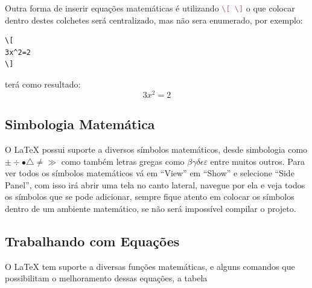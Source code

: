 Outra forma de inserir equações matemáticas é utilizando \lstinline[language=TeX]|\[ \]| o que colocar dentro destes colchetes será centralizado, mas não sera enumerado, por exemplo:
\begin{lstlisting}
\[
3x^2=2
\]
\end{lstlisting}
terá como resultado:
\[
3x^2=2
\]
\subsection{Simbologia Matemática}
O LaTeX possui suporte a diversos símbolos matemáticos, desde simbologia como $\pm \div \bullet \bigtriangleup \neq \gg$ como também letras gregas como $\beta \gamma \delta \epsilon \varepsilon$ entre muitos outros. Para ver todos os símbolos matemáticos vá em ``View'' em ``Show'' e selecione ``Side Panel'', com isso irá abrir uma tela no canto lateral, navegue por ela e veja todos os símbolos que se pode adicionar, sempre fique atento em colocar os símbolos dentro de um ambiente matemático, se não será impossível compilar o projeto.
\subsection{Trabalhando com Equações}
O LaTeX tem suporte a diversas funções matemáticas, e alguns comandos que possibilitam o melhoramento dessas equações, a tabela

\begin{table}[htb]
\end{table}

